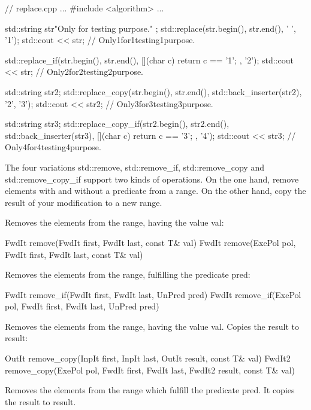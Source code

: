 \begin{cpp}
// replace.cpp
...
#include <algorithm>
...

std::string str{"Only for testing purpose." };
std::replace(str.begin(), str.end(), ' ', '1');
std::cout << str; // Only1for1testing1purpose.

std::replace_if(str.begin(), str.end(), [](char c){ return c == '1'; }, '2');
std::cout << str; // Only2for2testing2purpose.

std::string str2;
std::replace_copy(str.begin(), str.end(), std::back_inserter(str2), '2', '3');
std::cout << str2; // Only3for3testing3purpose.

std::string str3;
std::replace_copy_if(str2.begin(), str2.end(),
std::back_inserter(str3), [](char c){ return c == '3'; }, '4');
std::cout << str3; // Only4for4testing4purpose.
\end{cpp}


The four variations std::remove, std::remove\_if, std::remove\_copy and std::remove\_copy\_if support two kinds of operations. On the one hand, remove elements with and without a predicate from a range. On the other hand, copy the result of your modification to a new range.

Removes the elements from the range, having the value val:

\begin{cpp}
FwdIt remove(FwdIt first, FwdIt last, const T& val)
FwdIt remove(ExePol pol, FwdIt first, FwdIt last, const T& val)
\end{cpp}

Removes the elements from the range, fulfilling the predicate pred:

\begin{cpp}
FwdIt remove_if(FwdIt first, FwdIt last, UnPred pred)
FwdIt remove_if(ExePol pol, FwdIt first, FwdIt last, UnPred pred)
\end{cpp}

Removes the elements from the range, having the value val. Copies the result to result:

\begin{cpp}
OutIt remove_copy(InpIt first, InpIt last, OutIt result, const T& val)
FwdIt2 remove_copy(ExePol pol, FwdIt first, FwdIt last,
					FwdIt2 result, const T& val)
\end{cpp}

Removes the elements from the range which fulfill the predicate pred. It copies the result to result.

